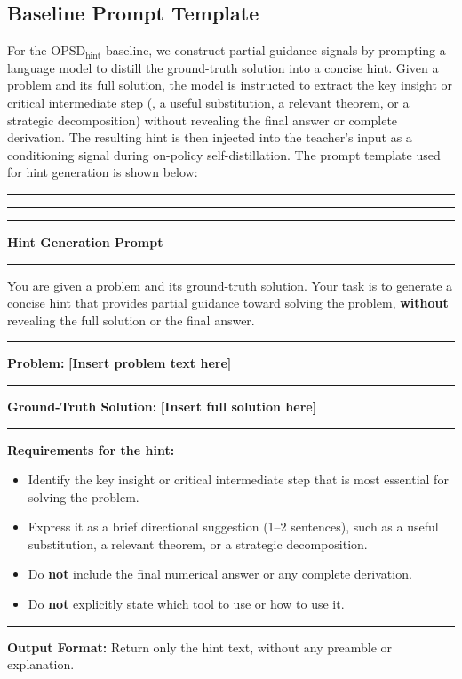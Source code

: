 \subsection{Baseline Prompt Template}
\label{opsd_hint}
For the OPSD$_{\mathrm{hint}}$ baseline, we construct partial guidance signals by prompting a language model to distill the ground-truth solution into a concise hint. Given a problem and its full solution, the model is instructed to extract the key insight or critical intermediate step (\eg, a useful substitution, a relevant theorem, or a strategic decomposition) without revealing the final answer or complete derivation. The resulting hint is then injected into the teacher's input as a conditioning signal during on-policy self-distillation. The prompt template used for hint generation is shown below:
\begin{tcolorbox}[
colframe=gray!30,
colback=gray!5,
coltitle=black!100,
title=\textit{\textbf{Prompt Template for Hint Generation}}
]

\rule{1.0\textwidth}{0.4pt}
\hrule
\vspace{0.3ex}
\hrule

\begin{center}
    \textbf{\large Hint Generation Prompt}
\end{center}
\vspace{-0.8em}
\rule{1.0\textwidth}{0.4pt}

You are given a problem and its ground-truth solution. Your task is to generate a concise hint that provides partial guidance toward solving the problem, \textbf{without} revealing the full solution or the final answer.

\rule{1.0\textwidth}{0.4pt}

\textbf{Problem:} \textcolor{violet!90}{\textbf{[Insert problem text here]}}

\rule{1.0\textwidth}{0.4pt}

\textbf{Ground-Truth Solution:} \textcolor{teal!80!black}{\textbf{[Insert full solution here]}}

\rule{1.0\textwidth}{0.4pt}

\textbf{Requirements for the hint:}
\begin{itemize}
    \item Identify the key insight or critical intermediate step that is most essential for solving the problem.
    \item Express it as a brief directional suggestion (1--2 sentences), such as a useful substitution, a relevant theorem, or a strategic decomposition.
    \item Do \textbf{not} include the final numerical answer or any complete derivation.
    \item Do \textbf{not} explicitly state which tool to use or how to use it.
\end{itemize}

\rule{1.0\textwidth}{0.4pt}

\textbf{Output Format:} Return only the hint text, without any preamble or explanation.

\end{tcolorbox}

